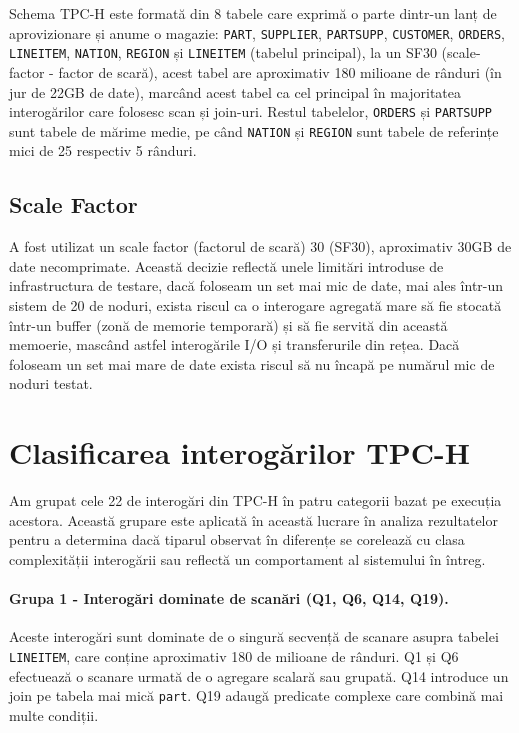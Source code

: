 Schema TPC-H este formată din 8 tabele care exprimă o parte dintr-un lanț de aprovizionare și anume o magazie: \texttt{PART}, \texttt{SUPPLIER}, \texttt{PARTSUPP}, \texttt{CUSTOMER}, \texttt{ORDERS}, \texttt{LINEITEM}, \texttt{NATION}, \texttt{REGION} și \texttt{LINEITEM} (tabelul principal), la un SF30 (scale-factor - factor de scară), acest tabel are aproximativ 180 milioane de rânduri (în jur de 22GB de date), marcând acest tabel ca cel principal în majoritatea interogărilor care folosesc scan și join-uri. Restul tabelelor, \texttt{ORDERS} și \texttt{PARTSUPP} sunt tabele de mărime medie, pe când \texttt{NATION} și \texttt{REGION} sunt tabele de referințe mici de 25 respectiv 5 rânduri.

\subsection{Scale Factor}

A fost utilizat un scale factor (factorul de scară) 30 (SF30), aproximativ 30GB de date necomprimate. Această decizie reflectă unele limitări introduse de infrastructura de testare, dacă foloseam un set mai mic de date, mai ales într-un sistem de 20 de noduri, exista riscul ca o interogare agregată mare să fie stocată într-un buffer (zonă de memorie temporară) și să fie servită din această memoerie, mascând astfel interogările I/O și transferurile din rețea. Dacă foloseam un set mai mare de date exista riscul să nu încapă pe numărul mic de noduri testat.


\section{Clasificarea interogărilor TPC-H}

Am grupat cele 22 de interogări din TPC-H în patru categorii bazat pe execuția acestora. Această grupare este aplicată în această lucrare în analiza rezultatelor pentru a determina dacă tiparul observat în diferențe se corelează cu clasa complexității interogării sau reflectă un comportament al sistemului în întreg.

\paragraph{Grupa 1 - Interogări dominate de scanări (Q1, Q6, Q14, Q19).} Aceste interogări sunt dominate de o singură secvență de scanare asupra tabelei \texttt{LINEITEM}, care conține aproximativ 180 de milioane de rânduri. Q1 și Q6 efectuează o scanare urmată de o agregare scalară sau grupată. Q14 introduce un join pe tabela mai mică \texttt{part}. Q19 adaugă predicate complexe care combină mai multe condiții.

